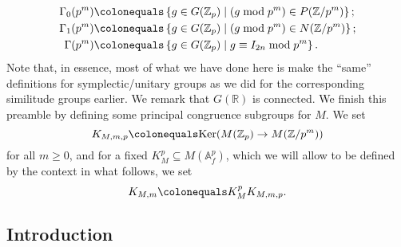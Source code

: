 \documentclass{amsart}
\theoremstyle{remark}
\numberwithin{equation}{subsection}
\newcommand{\A}{\AA}
\newcommand{\R}{\RR}
\newcommand{\Z}{\ZZ}
\renewcommand{\AA}{{\mathbb A}}
\newcommand{\RR}{{\mathbb R}}
\newcommand{\ZZ}{{\mathbb Z}}
\newcommand{\Zp}{\Z_p}
\newcommand{\sub}{\subseteq}
\newcommand{\defeq}{\colonequals}
\renewcommand{\(}{\left(}
\renewcommand{\)}{\right)}
\begin{document}
\begin{align*}
  \Gamma_0(p^m) & \defeq \left\{g\in G(\Zp) \mid (g \bmod p^m) \in P(\Z/p^m) \right\}; \\
  \Gamma_1(p^m) & \defeq \left\{g \in G(\Zp) \mid (g \bmod p^m) \in N(\Z/p^m) \right\}; \\
  \Gamma(p^m) & \defeq \left\{g \in G(\Zp) \mid g \equiv I_{2n} \bmod p^m \right\}.
\end{align*}
Note that, in essence, most of what we have done here is make the ``same'' definitions for symplectic/unitary groups as we did for the corresponding similitude groups earlier. We remark that $G(\R)$ is connected. We finish this preamble by defining some principal congruence subgroups for $M$. We set
\[
K_{M,m,p} \defeq \mathrm{Ker}(M(\Zp) \to M(\Z/p^m))
\]
for all $m\geq 0$, and for a fixed $K_M^p \sub M(\A_f^p)$, which we will allow to be defined by the context in what follows, we set
\[
K_{M,m} \defeq K_M^p K_{M,m,p}.
\]

\subsection{Introduction} \label{nilpotent intro}
\end{document}
